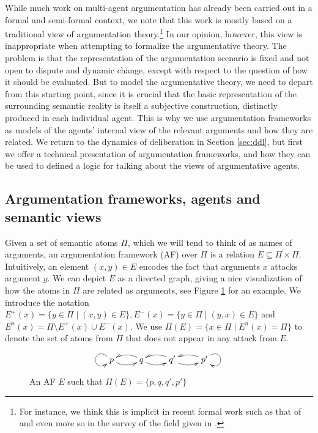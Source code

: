 \documentclass[greybox]{svmult}
\newcommand{\outa}[2]{#1^+(#2)}
\newcommand{\ina}[2]{#1^-(#2)}
\newcommand{\neu}[2]{#1^n(#2)}
\begin{document}
While much work on multi-agent argumentation has already been carried out in a formal and semi-formal context, we note that this work is mostly based on a traditional view of argumentation theory.\footnote{For instance, we think this is implicit in recent formal work such as that of \cite{pigozzi,pigozzi1} and even more so in the survey of the field given in \cite{rahwan}.} In our opinion, however, this view is inappropriate when attempting to formalize the argumentative theory.
The problem is that the representation of the argumentation scenario is fixed and not open to dispute and dynamic change, except with respect to the question of how it should be evaluated. But to model the argumentative theory, we need to depart from this starting point, since it is crucial that the basic representation of the surrounding semantic reality is itself a subjective construction, distinctly produced in each individual agent. This is why we use argumentation frameworks as models of the agents' internal view of the relevant arguments and how they are related. We return to the dynamics of deliberation in Section \ref{sec:ddl}, but first we offer a technical presentation of argumentation frameworks, and how they can be used to defined a logic for talking about the views of argumentative agents.

\subsection{Argumentation frameworks, agents and semantic views}\label{subsec:arg}

Given a set of semantic atoms $\Pi$, which we will tend to think of as names of arguments, an argumentation framework (AF) over $\Pi$ is a relation $E \subseteq \Pi \times \Pi$. Intuitively, an element $(x,y) \in E$ encodes the fact that arguments $x$ attacks argument $y$. We can depict $E$ as a directed graph, giving a nice visualization of how the atoms in $\Pi$ are related as arguments, see Figure \ref{fig:1} for an example. 
We introduce the notation $\outa E x = \{y \in \Pi \mid (x,y) \in E\}, \ina E x = \{y \in \Pi \mid (y,x) \in E\}$ and $\neu E x = \Pi \setminus \outa E x \cup \ina E x$. We use $\Pi(E) = \{x \in \Pi \mid \neu E x = \Pi\}$ to denote the set of atoms from $\Pi$ that does not appear in any attack from $E$.

\begin{figure}
$$
\xymatrix{p \ar@(lu,ld) \ar@/_/[r] & q \ar@/_/[l] \ar@/_/[r] & q' \ar@/_/[l] \ar@/_/[r] & p' \ar@(ru,rd) \ar@/_/[l] }
$$
\caption{An AF $E$ such that $\Pi(E) = \{p,q,q',p'\}$}
\label{fig:1}
\end{figure}
\end{document}
